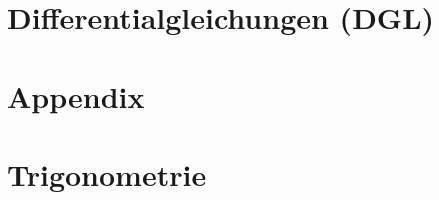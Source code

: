 \documentclass[numerate]{cheatsheet}
\begin{document}
    \section{Differentialgleichungen (DGL)}
        
        
        
        
        
        
        
        
        
        \vfill \null \columnbreak
        
        \vfill \null \columnbreak
        
        \newpage

    \section{Appendix}
        
        
        
        
        
        
        
        
        
        
        
        \vfill \null \columnbreak
        \section{Trigonometrie}
        
        
        
        
\end{document}
